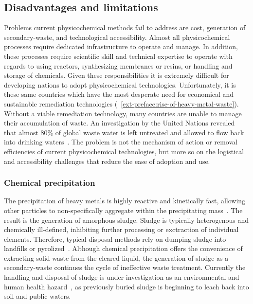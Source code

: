\documentclass[../main/main]{subfiles}
\begin{document}
\subsection{Disadvantages and limitations}
Problems current physicochemical methods fail to address are cost, generation of secondary-waste, and technological accessibility. Almost all physicochemical processes require dedicated infrastructure to operate and manage. In addition, these processes require scientific skill and technical expertise to operate with regards to using reactors, synthesizing membranes or resins, or handling and storage of chemicals. Given these responsibilities it is extremely difficult for developing nations to adopt physicochemical technologies. Unfortunately, it is these same countries which have the most desperate need for economical and sustainable remediation technologies (\CHAPTER~\ref{ext-preface:rise-of-heavy-metal-waste}). Without a viable remediation technology, many countries are unable to manage their accumulation of waste. An investigation by the United Nations revealed that almost 80\% of global waste water is left untreated and allowed to flow back into drinking waters~\cite{unitednations2015,unu-inweh2017}. The problem is not the mechanism of action or removal efficiencies of current physicochemical technologies, but more so on the logistical and accessibility challenges that reduce the ease of adoption and use.

\subsubsection*{Chemical precipitation}
The precipitation of heavy metals is highly reactive and kinetically fast, allowing other particles to non-specifically aggregate within the precipitating mass~\cite{fu2011}. The result is the generation of amorphous sludge. Sludge is typically heterogenous and chemically ill-defined, inhibiting further processing or exctraction of individual elements. Therefore, typical disposal methods rely on dumping sludge into landfills or pyrolized~\cite{kurniawan2006,kumargupta2012}. Although chemical precipitation offers the convenience of extracting solid waste from the cleared liquid, the generation of sludge as a secondary-waste continues the cycle of ineffective waste treatment. Currently the handling and disposal of sludge is under investigation as an environmental and human health hazard~\cite{EPA_chemprecip_review}, as previously buried sludge is beginning to leach back into soil and public waters.
\end{document}
